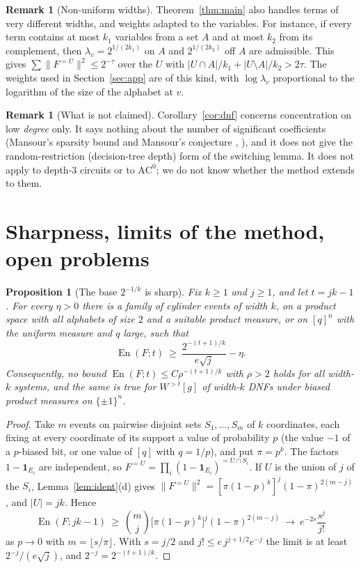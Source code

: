 \documentclass[11pt,reqno]{amsart}
\newtheorem{proposition}[theorem]{Proposition}
\theoremstyle{definition}
\newtheorem{remark}[theorem]{Remark}
\newcommand{\energy}{\operatorname{En}}
\begin{document}
\begin{remark}[Non-uniform widths]\label{rem:widths}
Theorem~\ref{thm:main} also handles terms of very different widths, and
weights adapted to the variables.  For instance, if every term contains at
most $k_1$ variables from a set $A$ and at most $k_2$ from its complement,
then $\lambda_v=2^{1/(2k_1)}$ on $A$ and $2^{1/(2k_2)}$ off $A$ are admissible.  This
gives $\sum\|F^{=U}\|^2\le2^{-\tau}$ over the $U$ with
$|U\cap A|/k_1+|U\setminus A|/k_2>2\tau$.  The weights used in
Section~\ref{sec:app} are of this kind, with $\log\lambda_v$ proportional to the
logarithm of the size of the alphabet at $v$.
\end{remark}

\begin{remark}[What is not claimed]\label{rem:notclaimed}
Corollary~\ref{cor:dnf} concerns concentration on low \emph{degree} only.  It
says nothing about the number of significant coefficients (Mansour's
sparsity bound and Mansour's conjecture \cite{Mansour}, \cite{LT}), and it does
not give the random-restriction (decision-tree depth) form of the switching
lemma.  It does not apply to depth-$3$ circuits or to $\mathrm{AC}^0$; we do
not know whether the method extends to them.
\end{remark}

\section{Sharpness, limits of the method, open problems}\label{sec:sharp}

\begin{proposition}[The base $2^{-1/k}$ is sharp]\label{prop:sharp}
Fix $k\ge1$ and $j\ge1$, and let $t=jk-1$.  For every $\eta>0$ there is a family of
cylinder events of width $k$, on a product space with all alphabets of size
$2$ and a suitable product measure, or on $[q]^n$ with the uniform measure
and $q$ large, such that
\[
 \energy(F;t)\ \ge\ \frac{2^{-(t+1)/k}}{e\sqrt j}-\eta .
\]
Consequently, no bound $\energy(F;t)\le C\rho^{-(t+1)/k}$ with $\rho>2$ holds for all
width-$k$ systems, and the same is true for $W^{>t}[g]$ of width-$k$ DNFs
under biased product measures on $\{\pm1\}^n$.
\end{proposition}

\begin{proof}
Take $m$ events on pairwise disjoint sets $S_1,\dots,S_m$ of $k$ coordinates,
each fixing at every coordinate of its support a value of probability $p$
(the value $-1$ of a $p$-biased bit, or one value of $[q]$ with $q=1/p$), and
put $\pi=p^k$.  The factors $1-\mathbf 1_{E_i}$ are independent, so
$F^{=U}=\prod_i(1-\mathbf 1_{E_i})^{=U\cap S_i}$.  If $U$ is the union of $j$ of the $S_i$,
Lemma~\ref{lem:ident}(d) gives $\|F^{=U}\|^2=[\pi(1-p)^k]^j(1-\pi)^{2(m-j)}$, and
$|U|=jk$.  Hence
\[
 \energy(F;jk-1)\ \ge\ \binom mj\big[\pi(1-p)^k\big]^j(1-\pi)^{2(m-j)}
 \ \longrightarrow\ e^{-2s}\frac{s^j}{j!}
\]
as $p\to0$ with $m=\lfloor s/\pi\rfloor$.  With $s=j/2$ and $j!\le e\,j^{j+1/2}e^{-j}$ the
limit is at least $2^{-j}/(e\sqrt j)$, and $2^{-j}=2^{-(t+1)/k}$.
\end{proof}
\end{document}
